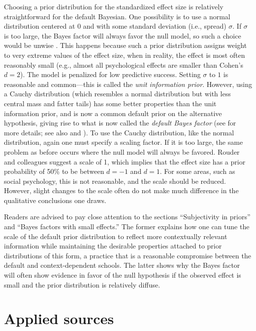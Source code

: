 Choosing a prior distribution for the standardized effect size is relatively straightforward for the default Bayesian. One possibility is to use a normal distribution centered at $0$ and with some standard deviation (i.e., spread) $\sigma$. If $\sigma$ is too large, the Bayes factor will always favor the null model, so such a choice would be unwise \cite<see also>{degroot1982lindley,robert2014}. This happens because such a prior distribution assigns weight to very extreme values of the effect size, when in reality, the effect is most often reasonably small (e.g., almost all psychological effects are smaller than Cohen's $d = 2$).
The model is penalized for low predictive success.
Setting $\sigma$ to $1$ is reasonable and common---this is called the \textit{unit information prior}. However, using a Cauchy distribution (which resembles a normal distribution but with less central mass and fatter tails) has some better properties than the unit information prior, and is now a common default prior on the alternative hypothesis, giving rise to what is now called the \textit{default Bayes factor} (see  for more details; see also  and ). To use the Cauchy distribution, like the normal distribution, again one must specify a scaling factor. If it is too large, the same problem as before occurs where the null model will always be favored. Rouder and colleagues suggest a scale of 1, which implies that the effect size has a prior probability of 50\% to be between $d = -1$ and $d = 1$. For some areas, such as social psychology, this is not reasonable, and the scale should be reduced. However, slight changes to the scale often do not make much difference in the qualitative conclusions one draws.

Readers are advised to pay close attention to the sections ``Subjectivity in priors'' and ``Bayes factors with small effects.'' The former explains how one can tune the scale of the default prior distribution to reflect more contextually relevant information while maintaining the desirable properties attached to prior distributions of this form, a practice that is a reasonable compromise between the default and context-dependent schools. The latter shows why the Bayes factor will often show evidence in favor of the null hypothesis if the observed effect is small and the prior distribution is relatively diffuse.

\section{Applied sources}

